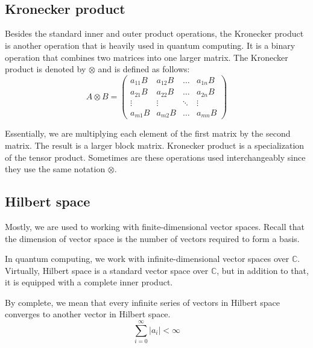 \\ 
\\ 
\subsection{Kronecker product}
Besides the standard inner and outer product operations, the Kronecker product is another operation that is heavily used in quantum computing. It is a binary operation that combines two matrices into one larger matrix. The Kronecker product is denoted by $\otimes$ and is defined as follows:
$$A \otimes B = \begin{pmatrix}
    a_{11}B & a_{12}B & \hdots & a_{1n}B \\
    a_{21}B & a_{22}B & \hdots & a_{2n}B \\
    \vdots & \vdots & \ddots & \vdots \\
    a_{m1}B & a_{m2}B & \hdots & a_{mn}B
\end{pmatrix}$$

Essentially, we are multiplying each element of the first matrix by the second matrix. The result is a larger block matrix. Kronecker product is a specialization of the tensor product. Sometimes are these operations used interchangeably since they use the same notation $\otimes$.

\subsection{Hilbert space}
Mostly, we are used to working with finite-dimensional vector spaces. Recall that the dimension of vector space is the number of vectors required to form a basis.

In quantum computing, we work with infinite-dimensional vector spaces over $\mathbb{C}$. Virtually, Hilbert space is a standard vector space over $\mathbb{C}$, but in addition to that, it is equipped with a complete inner product.

By complete, we mean that every infinite series of vectors in Hilbert space converges to another vector in Hilbert space. $$\sum_{i=0}^{\infty}\vert a_i \vert < \infty$$
